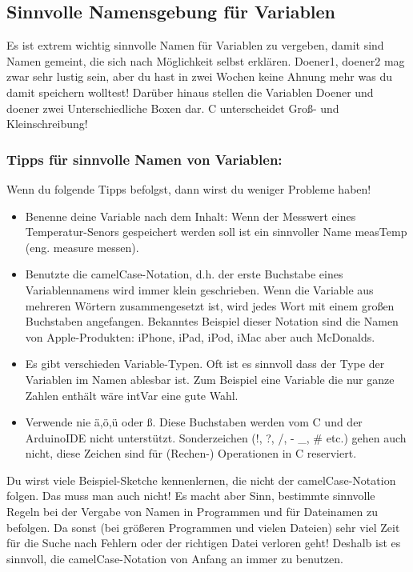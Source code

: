 \subsection{Sinnvolle Namensgebung für Variablen}

Es ist extrem wichtig sinnvolle Namen für Variablen zu vergeben, damit sind Namen gemeint, die sich nach Möglichkeit selbst erklären. Doener1, doener2 mag zwar sehr lustig sein, aber du hast in zwei Wochen keine Ahnung mehr was du damit speichern wolltest! Darüber hinaus stellen die Variablen Doener und doener zwei Unterschiedliche Boxen dar. C unterscheidet Groß- und Kleinschreibung! 

\subsubsection{Tipps für sinnvolle Namen von  Variablen:}
Wenn du folgende Tipps befolgst, dann wirst du weniger Probleme haben!
\begin{itemize}
  \item Benenne deine Variable nach dem Inhalt: Wenn der Messwert eines Temperatur-Senors gespeichert werden soll ist ein sinnvoller Name measTemp (eng. measure messen).
  \item Benutzte die camelCase-Notation, d.h. der erste Buchstabe eines Variablennamens wird immer klein geschrieben. Wenn die Variable aus mehreren Wörtern zusammengesetzt ist, wird jedes Wort mit einem großen Buchstaben angefangen. Bekanntes Beispiel dieser Notation sind die Namen von Apple-Produkten:  iPhone, iPad, iPod, iMac aber auch McDonalds.
  \item Es gibt verschieden Variable-Typen. Oft ist es sinnvoll dass der Type der Variablen im Namen ablesbar ist. Zum Beispiel eine Variable die nur ganze Zahlen enthält wäre intVar eine gute Wahl. 
  \item Verwende nie ä,ö,ü oder ß. Diese Buchstaben werden vom C und der ArduinoIDE nicht unterstützt. Sonderzeichen (!, ?, /, - \_, \# etc.)  gehen auch nicht, diese Zeichen sind für (Rechen-) Operationen in C reserviert.    
\end{itemize}
Du wirst viele Beispiel-Sketche kennenlernen, die nicht der camelCase-Notation folgen. Das muss man auch nicht! Es macht aber Sinn, bestimmte sinnvolle Regeln bei der Vergabe von Namen in Programmen und für Dateinamen zu befolgen. Da sonst (bei größeren Programmen und vielen Dateien) sehr viel Zeit für die Suche nach Fehlern oder der richtigen Datei verloren geht!  Deshalb ist es sinnvoll, die camelCase-Notation von Anfang an immer zu benutzen.

